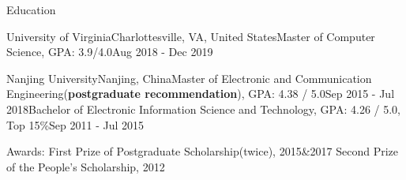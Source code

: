 \documentclass{resume} %
\begin{document}
\pagestyle{empty}


\begin{rSection}{\sc Education}
	\begin{Education2}
	{University of Virginia}{Charlottesville, VA, United States}{Master of Computer Science, GPA: 3.9/4.0}{Aug 2018 - Dec 2019}
	
	\end{Education2}

	\begin{Education}
		{Nanjing University}{Nanjing, China}{Master of Electronic and Communication Engineering(\textbf{postgraduate recommendation}), GPA: 4.38 / 5.0}{Sep 2015 - Jul 2018}{Bachelor of Electronic Information Science and Technology, GPA: 4.26 / 5.0, Top 15\%}{Sep 2011 - Jul 2015}
		\item Awards:  First Prize of Postgraduate Scholarship(twice), 2015\&2017
		\newline  \hphantom{Awards:} Second Prize of the People’s Scholarship, 2012
	\end{Education}

\end{rSection}
\end{document}
